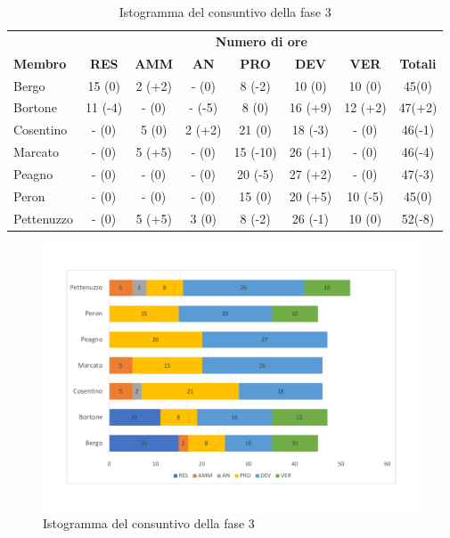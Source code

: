 	\begin{table}[H]
		\centering
		\begin{tabular}{| l | c c c c c c | c |}
			\rowcolor{LightBlue}
			& \multicolumn{7}{c}{\textbf{\color{white}Numero di ore}}	\\
			
			\rowcolor{LightBlue}
			\textbf{\color{white}Membro}
			& \textbf{\color{white}RES}
			& \textbf{\color{white}AMM}
			& \textbf{\color{white}AN}
			& \textbf{\color{white}PRO}
			& \textbf{\color{white}DEV}
			& \textbf{\color{white}VER}
			& \textbf{\color{white}Totali}\\
			Bergo     		& 15  (0) & 2 (+2) 	& -  (0) 		& 8 (-2) & 10 (0) & 10 (0) 	& 45(0)\\
			Bortone   		& 11  (-4) & -  (0) 	& -  (-5) 		& 8 (0) & 16 (+9) & 12 (+2)	& 47(+2)\\
			Cosentino & - (0) & 5 (0) 	& 2 (+2) & 21 (0) & 18 (-3) & - (0)	& 46(-1)\\
			Marcato  & -  (0) & 5 (+5) 	& -  (0) & 15 (-10) & 26 (+1) & - (0) & 46(-4)\\
			Peagno    		& -  (0) & - (0) & -  (0) & 20 (-5) & 27 (+2) & - (0)	& 47(-3)\\
			Peron   & -  (0) & -  (0) 	& -  (0) & 15 (0) & 20 (+5) &  10 (-5)	& 45(0)\\
			Pettenuzzo 		& - (0) & 5 (+5) & 3 (0) & 8 (-2) & 26 (-1) & 10 (0)	& 52(-8)\\ \hline
		\end{tabular}
		\caption{Ore di lavoro impiegate per membro/ruolo della fase 3}
		
		\begin{figure}[H]
			\centering
			\includegraphics[scale=0.45]{images/consuntivoRQ.pdf}
			\caption{Istogramma del consuntivo della fase 3}
		\end{figure}
		
		
	\end{table}
